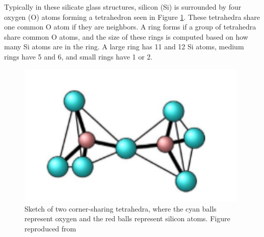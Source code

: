 Typically in these silicate glass structures, silicon (Si) is surrounded by four oxygen (O) atoms forming a tetrahedron seen in Figure \ref{tetrahedra}. These tetrahedra share one common O atom if they are neighbors. A ring forms if a group of tetrahedra share common O atoms, and the size of these rings is computed based on how many Si atoms are in the ring. A large ring has 11 and 12 Si atoms, medium rings have 5 and 6, and small rings have 1 or 2.

\begin{figure}[!h]
  \centering
  \includegraphics[width=11cm]{picture/tetrahedra.PNG}
  \caption{Sketch of two corner-sharing tetrahedra, where the cyan balls represent oxygen
and the red balls represent silicon atoms.
Figure reproduced from~\protect\cite{ebrahem2018influence}} 
  \label{tetrahedra}
\end{figure}

